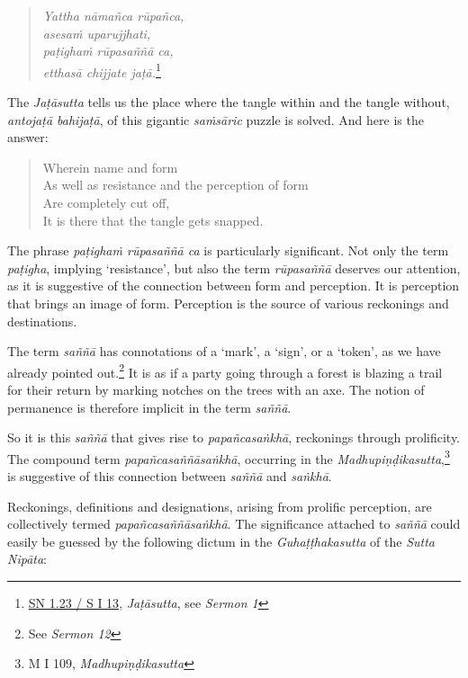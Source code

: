 \begin{quote}
\emph{Yattha nāmañca rūpañca,}\\
\emph{asesaṁ uparujjhati,}\\
\emph{paṭighaṁ rūpasaññā ca,}\\
\emph{etthasā chijjate jaṭā.}\footnote{\href{https://suttacentral.net/sn1.23/pli/ms}{SN 1.23 / S I 13}, \emph{Jaṭāsutta}, see \emph{Sermon 1}}
\end{quote}

\clearpage

The \emph{Jaṭāsutta} tells us the place where the tangle within and the tangle without, \emph{antojaṭā bahijaṭā}, of this gigantic \emph{saṁsāric} puzzle is solved. And here is the answer:

\begin{quote}
Wherein name and form\\
As well as resistance and the perception of form\\
Are completely cut off,\\
It is there that the tangle gets snapped.
\end{quote}

The phrase \emph{paṭighaṁ rūpasaññā ca} is particularly significant. Not only the term \emph{paṭigha}, implying `resistance', but also the term \emph{rūpasaññā} deserves our attention, as it is suggestive of the connection between form and perception. It is perception that brings an image of form. Perception is the source of various reckonings and destinations.

The term \emph{saññā} has connotations of a `mark', a `sign', or a `token', as we have already pointed out.\footnote{See \emph{Sermon 12}} It is as if a party going through a forest is blazing a trail for their return by marking notches on the trees with an axe. The notion of permanence is therefore implicit in the term \emph{saññā}.

So it is this \emph{saññā} that gives rise to \emph{papañcasaṅkhā}, reckonings through prolificity. The compound term \emph{papañcasaññāsaṅkhā}, occurring in the \emph{Madhupiṇḍikasutta},\footnote{M I 109, \emph{Madhupiṇḍikasutta}} is suggestive of this connection between \emph{saññā} and \emph{saṅkhā}.

Reckonings, definitions and designations, arising from prolific perception, are collectively termed \emph{papañcasaññāsaṅkhā}. The significance attached to \emph{saññā} could easily be guessed by the following dictum in the \emph{Guhaṭṭhakasutta} of the \emph{Sutta Nipāta}:

